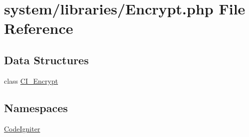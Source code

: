 \hypertarget{_encrypt_8php}{}\section{system/libraries/\+Encrypt.php File Reference}
\label{_encrypt_8php}
\subsection*{Data Structures}
\begin{DoxyCompactItemize}
\item 
class \mbox{\hyperlink{class_c_i___encrypt}{C\+I\+\_\+\+Encrypt}}
\end{DoxyCompactItemize}
\subsection*{Namespaces}
\begin{DoxyCompactItemize}
\item 
 \mbox{\hyperlink{namespace_code_igniter}{Code\+Igniter}}
\end{DoxyCompactItemize}
